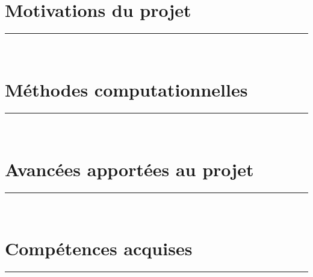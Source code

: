 \author{
{\FirstNameA\ \AuthorA{}}, 
{\FirstNameB\ \AuthorB{}}
}


\conference{\Conference}
 
\maketitle

\begin{multicols}{3}

\section*{Motivations du projet}
\rule[30ex]{\linewidth}{3pt}\\
\ParagMotiv
\columnbreak

\section*{Méthodes computationnelles}
\rule[30ex]{\linewidth}{3pt}\\
\ParagMethComp
\columnbreak

\section*{Avancées apportées au projet}
\rule[30ex]{\linewidth}{3pt}\\
\ParagAmelio

\section*{Compétences acquises}
\rule[30ex]{\linewidth}{3pt}\\
\ParagCompAcqu

\end{multicols}

